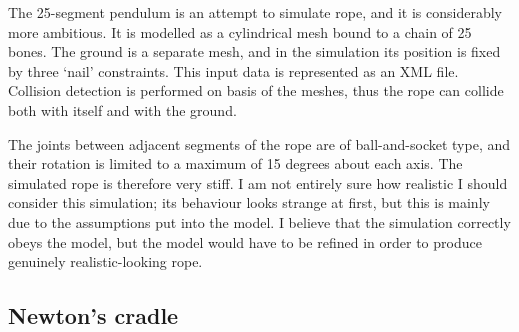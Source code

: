 The 25-segment pendulum is an attempt to simulate rope, and it is considerably more ambitious.
It is modelled as a cylindrical mesh bound to a chain of 25 bones. The ground is a separate mesh,
and in the simulation its position is fixed by three `nail' constraints. This input data is
represented as an XML file. Collision detection is performed on basis of the meshes, thus the
rope can collide both with itself and with the ground.

The joints between adjacent segments of the rope are of ball-and-socket type, and their rotation
is limited to a maximum of 15 degrees about each axis. The si\-mu\-la\-ted rope is therefore very
stiff. I am not entirely sure how realistic I should consider this simulation; its behaviour looks
strange at first, but this is mainly due to the assumptions put into the model. I believe that
the simulation correctly obeys the model, but the model would have to be refined in order
to produce genuinely realistic-looking rope.

\subsection{Newton's cradle}

